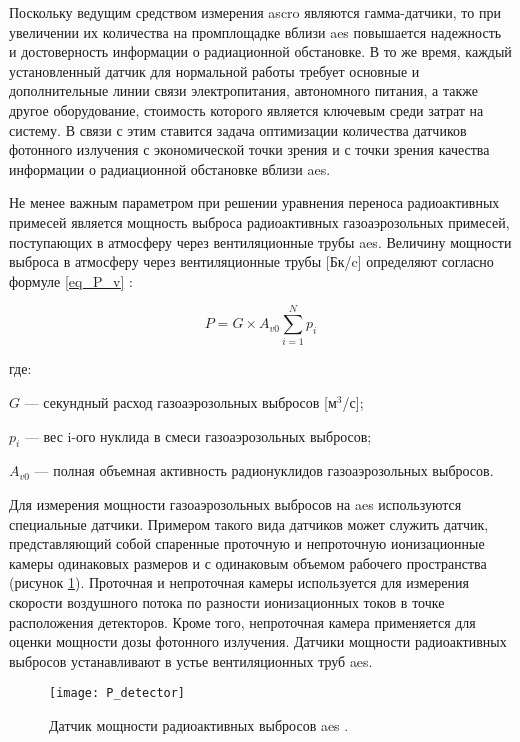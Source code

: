 Поскольку ведущим средством измерения \ac{ascro} являются гамма-датчики, то при увеличении их количества на промплощадке 
вблизи \ac{aes} повышается надежность и достоверность информации о радиационной обстановке. В то же время, каждый 
установленный датчик для нормальной работы требует основные и дополнительные линии связи электропитания, автономного 
питания, а также другое оборудование, стоимость которого является ключевым среди затрат на систему. В связи с этим 
ставится задача оптимизации количества датчиков фотонного излучения с экономической точки зрения и с точки зрения 
качества информации о радиационной обстановке вблизи \ac{aes}.

Не менее важным параметром при решении уравнения переноса радиоактивных примесей является мощность выброса радиоактивных 
газоаэрозольных примесей, поступающих в атмосферу через вентиляционные трубы \ac{aes}. Величину мощности выброса в 
атмосферу через вентиляционные трубы [Бк/c] определяют согласно формуле \ref{eq_P_v} \cite{elokhin}:

\begin{equation}
    \label{eq_P_v}
    P = G \times A_{v0} \sum_{i=1}^{N} p_i
\end{equation}

где:
\begin{description}
    \item $G$ --- секундный расход газоаэрозольных выбросов [м$^3$/с];
    \item $p_i$ --- вес i-ого нуклида в смеси газоаэрозольных выбросов;
    \item $A_{v0}$ --- полная объемная активность радионуклидов газоаэрозольных выбросов.
\end{description}

Для измерения мощности газоаэрозольных выбросов на \ac{aes} используются специальные датчики. Примером такого вида 
датчиков может служить датчик, представляющий собой спаренные проточную и непроточную ионизационные камеры одинаковых 
размеров и с одинаковым объемом рабочего пространства (рисунок \ref{fig_P_detector}). Проточная и непроточная камеры 
используется для измерения скорости воздушного потока по разности ионизационных токов в точке расположения детекторов. 
Кроме того, непроточная камера применяется для оценки мощности дозы фотонного излучения. Датчики мощности радиоактивных 
выбросов устанавливают в устье вентиляционных труб \ac{aes}.

\begin{figure}[ht!]
	\centering
	\texttt{[image: P\_detector]}
	\captionsetup{justification=centering}
    \caption{Датчик мощности радиоактивных выбросов \ac{aes} \cite{elokhin}.}
    \label{fig_P_detector}
\end{figure}

